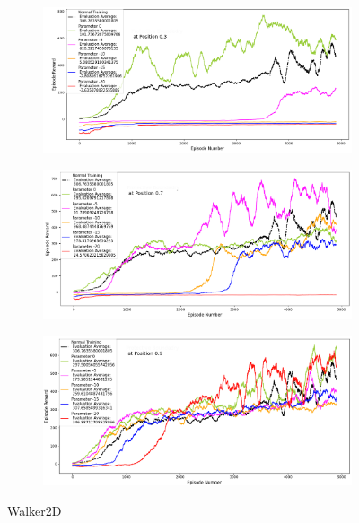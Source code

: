 \documentclass[journal]{IEEEtran}
\begin{document}
\begin{figure}
    \centering
    \begin{subfigure}[b]{0.5\textwidth}
      \centering
      \includegraphics[width=\textwidth]{Walker_with_Boundary_at_0.3.png}
    \end{subfigure}
    \vspace*{0.0mm}
    \begin{subfigure}[b]{0.5\textwidth}
      \centering
      \includegraphics[width=\textwidth]{Walker_with_Boundary_at_0.7.png}
    \end{subfigure}
    \vspace*{0.0mm}
    \begin{subfigure}[b]{0.5\textwidth}
      \centering
      \includegraphics[width=\textwidth]{Walker_with_Boundary_at_0.9.png}
    \end{subfigure}
    \caption{Walker2D}
    \label{fig:Walker}
\end{figure}
\end{document}
